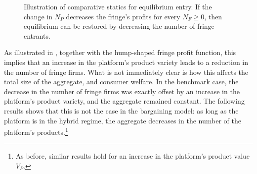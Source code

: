\documentclass[a4paper]{article}
\begin{document}
\begin{figure}[ht]
    \centering
    \caption{Illustration of comparative statics for equilibrium entry. If the change in $N_P$ decreases the fringe's profits for every $N_F \geq 0$, then equilibrium can be restored by decreasing the number of fringe entrants.}
    \label{fig:comparative_N_F}
\end{figure}

As illustrated in , together with the hump-shaped fringe profit function, this implies that an increase in the platform's product variety leads to a reduction in the number of fringe firms.
What is not immediately clear is how this affects the total size of the aggregate, and consumer welfare.
In the benchmark case, the decrease in the number of fringe firms was exactly offset by an increase in the platform's product variety, and the aggregate remained constant.
The following results shows that this is not the case in the bargaining model: as long as the platform is in the hybrid regime, the aggregate decreases in the number of the platform's products.\footnote{
    As before, similar results hold for an increase in the platform's product value $V_P$.
}
\end{document}
